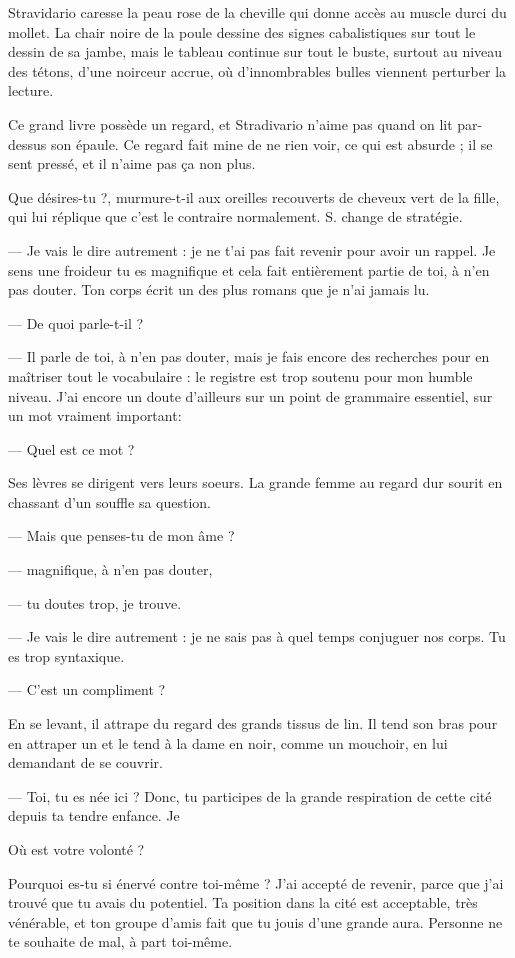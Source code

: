 Stravidario caresse la peau rose de la cheville qui donne accès au
muscle durci du mollet. La chair noire de la poule dessine des signes
cabalistiques sur tout le dessin de sa jambe, mais le tableau continue
sur tout le buste, surtout au niveau des tétons, d'une noirceur accrue,
où d'innombrables bulles viennent perturber la lecture.

Ce grand livre possède un regard, et Stradivario n'aime pas quand on
lit par-dessus son épaule. Ce regard fait mine de ne rien voir, ce qui
est absurde ; il se sent pressé, et il n'aime pas ça non plus. 

Que désires-tu ?, murmure-t-il aux oreilles recouverts de cheveux vert
de la fille, qui lui réplique que c'est le contraire
normalement. S. change de stratégie.

--- Je vais le dire autrement : je ne t'ai pas fait revenir pour avoir un
rappel. Je sens une froideur tu es magnifique et cela fait entièrement partie de toi, à n'en
pas douter. Ton corps écrit un des plus romans que je n'ai jamais lu.

--- De quoi parle-t-il ?

--- Il parle de toi, à n'en pas douter, mais je fais encore des
recherches pour en maîtriser tout le vocabulaire : le registre est
trop soutenu pour mon humble niveau. J'ai encore un doute d'ailleurs
sur un point de grammaire essentiel, sur un mot vraiment important:

--- Quel est ce mot ?

Ses lèvres se dirigent vers leurs soeurs. La grande femme au regard
dur sourit en chassant d'un souffle sa question.

--- Mais que penses-tu de mon âme ?

--- magnifique, à n'en pas douter, 

--- tu doutes trop, je trouve.

--- Je vais le dire autrement : je ne sais pas à quel temps
conjuguer nos corps. Tu es trop syntaxique.

--- C'est un compliment ?

En se levant, il attrape du regard des grands tissus de lin. Il tend
son bras pour en attraper un et le tend à la dame en noir, comme un
mouchoir, en lui demandant de se couvrir.

--- Toi, tu es née ici ? Donc, tu participes de la grande respiration
de cette cité depuis ta tendre enfance. Je

Où est votre volonté ? 

Pourquoi es-tu si énervé contre toi-même ? J'ai accepté de revenir,
parce que j'ai trouvé que tu avais du potentiel. Ta position dans la
cité est acceptable, très vénérable, et ton groupe d'amis fait que tu
jouis d'une grande aura. Personne ne te souhaite de mal, à part
toi-même.
